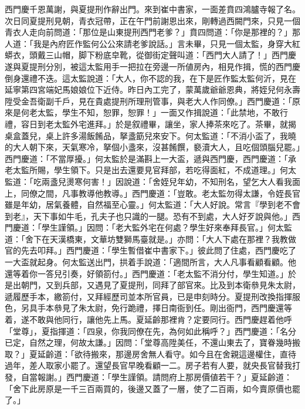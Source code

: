 西門慶千恩萬謝，與夏提刑作辭出門。來到崔中書家，一面差賁四鴻臚寺報了名。次日同夏提刑見朝，青衣冠帶，正在午門前謝恩出來，剛轉過西闕門來，只見一個青衣人走向前問道：「那位是山東提刑西門老爹？」賁四問道：「你是那裡的？」那人道：「我是內府匠作監何公公來請老爹說話。」言未畢，只見一個太監，身穿大紅蟒衣，頭戴三山帽，脚下粉底皁靴，從御街定聲叫道：「西門大人請了！」西門慶遂與夏提刑分別，被這太監用手一把拉在旁邊一所値房內，相見作揖，慌的西門慶倒身還禮不迭。這太監說道：「大人，你不認的我，在下是匠作監太監何沂，見在延寧第四宮端妃馬娘娘位下近侍。昨日內工完了，蒙萬歲爺爺恩典，將姪兒何永壽陞受金吾衛副千戶，見在貴處提刑所理刑管事，與老大人作同僚。」西門慶道：「原來是何老太監，學生不知，恕罪，恕罪！」一面又作揖說道：「此禁地，不敢行禮，容日到老太監外宅進拜。」於是叙禮畢，讓坐，家人捧茶來吃了。茶畢，就揭桌盒蓋兒，桌上許多湯飯餚品，拏盞筯兒來安下。何太監道：「不消小盃了，我曉的大人朝下來，天氣寒冷，拏個小盞來，沒甚餚饌，褻瀆大人，且吃個頭腦兒罷。」西門慶道：「不當厚擾。」何太監於是滿斟上一大盃，遞與西門慶，西門慶道：「承老太監所賜，學生領下。只是出去還要見官拜部，若吃得面紅，不成道理。」何太監道：「吃兩盞兒燙寒何害！」因說道：「舍姪兒年幼，不知刑名，望乞大人看我面上，同僚之間，凡事教導他教導。」西門慶道：「豈敢。老太監勿得太謙，令姪長官雖是年幼，居氣養體，自然福至心靈。」何太監道：「大人好說。常言『學到老不會到老』，天下事如牛毛，孔夫子也只識的一腿。{}恐有不到處，大人好歹說與他。」西門慶道：「學生謹領。」因問：「老大監外宅在何處？學生好來奉拜長官。」何太監道：「舍下在天漢橋東，文華坊雙獅馬臺就是。」亦問：「大人下處在那裡？我教做官的先去叩拜。」西門慶道：「學生暫借崔中書家下。」彼此問了住處，西門慶吃了一大盃就起身。何太監送出門，拱着手說道：「適間所言，大人凡事看顧看顧。他還等着你一答兒引奏，好領箚付。」西門慶道：「老太監不消分付，學生知道。」於是出朝門，又到兵部，又遇見了夏提刑，同拜了部官來。比及到本衛叅見朱太尉，遞履歷手本，繳箚付，又拜經歷司並本所官員，已是申刻時分。夏提刑改換指揮服色，另具手本叅見了朱太尉，免行跪禮，擇日南衙到任。剛出衙門，西門慶還等着，遂不敢與他同行，讓他先上馬。夏延齡那裡肯？定要同行。西門慶趕着他呼「堂尊」，夏指揮道：「四泉，你我同僚在先，為何如此稱呼？」西門慶道：「名分已定，自然之理，何故太謙。」因問：「堂尊高陞美任，不還山東去了，寶眷幾時搬取？」夏延齡道：「欲待搬來，那邊房舍無人看守。如今且在舍親這邊權住，直待過年，差人取家小罷了。還望長官早晚看顧一二。房子若有人要，就央長官替我打發，自當報謝。」西門慶道：「學生謹領。請問府上那房價値若干？」夏延齡道：「舍下此房原是一千三百兩買的，後邊又蓋了一層，使了二百兩，如今賣原價也罷了。」

